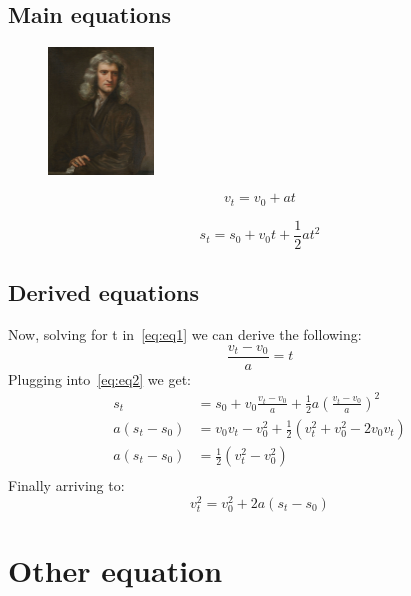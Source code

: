\documentclass[10pt, oneside]{article}
\begin{document}
\subsection{Main equations}\label{subsec:main-equations}
\begin{figure} %
    \centering
    \includegraphics[width=0.25\textwidth]{./images/newton1}
\end{figure}

\begin{equation}\label{eq:eq1}
    v_{t} = v_{0} + a  t
\end{equation}

\begin{equation}\label{eq:eq2}
    s_{t} = s_{0} + v_{0}t + \frac{1}{2}at^2
\end{equation}

\subsection{Derived equations}\label{subsec:derived-equations}
Now, solving for t in~\ref{eq:eq1} we can derive the following:
\begin{equation}\label{eq:eq3}
    \frac{v_{t} - v_{0}}{a} =  t
\end{equation}
Plugging into~\ref{eq:eq2} we get:
\begin{equation}\label{eq:eq4} \nonumber
\begin{split}
s_{t} & = s_{0}+v_{0}\frac{v_{t} - v_{0}}{a}+\frac{1}{2}a\left(\frac{v_{t} - v_{0}}{a}\right)^2 \\
a(s_{t} - s_{0}) & = v_{0}v_{t}-v_{0}^2 + \frac{1}{2}(v_{t}^2+v_{0}^2-2v_{0}v_{t}) \\
a(s_{t} - s_{0}) & = \frac{1}{2}(v_{t}^2-v_{0}^2) \\
\end{split}
\end{equation}
Finally arriving to:
\begin{equation}\label{eq:eq5}
    v_{t}^2 = v_{0}^2 +2a(s_{t}-s_{0})
\end{equation}

\newpage
\section{Other equation}\label{sec:other-equation}
\end{document}
